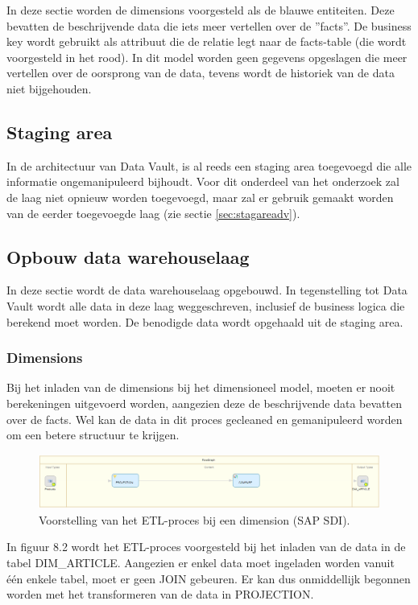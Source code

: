 In deze sectie worden de dimensions voorgesteld als de blauwe entiteiten. Deze bevatten de beschrijvende data die iets meer vertellen over de ''facts''. De business key wordt gebruikt als attribuut die de relatie legt naar de facts-table (die wordt voorgesteld in het rood). In dit model worden geen gegevens opgeslagen die meer vertellen over de oorsprong van de data, tevens wordt de historiek van de data niet bijgehouden.

\subsection{Staging area}
In de architectuur van Data Vault, is al reeds een staging area toegevoegd die alle informatie ongemanipuleerd bijhoudt. Voor dit onderdeel van het onderzoek zal de laag niet opnieuw worden toegevoegd, maar zal er gebruik gemaakt worden van de eerder toegevoegde laag (zie sectie \ref{sec:stagareadv}).

\subsection{Opbouw data warehouselaag}
In deze sectie wordt de data warehouselaag opgebouwd. In tegenstelling tot Data Vault wordt alle data in deze laag weggeschreven, inclusief de business logica die berekend moet worden. De benodigde data wordt opgehaald uit de staging area.

\subsubsection{Dimensions}
Bij het inladen van de dimensions bij het dimensioneel model, moeten er nooit berekeningen uitgevoerd worden, aangezien deze de beschrijvende data bevatten over de facts. Wel kan de data in dit proces gecleaned en gemanipuleerd worden om een betere structuur te krijgen. 

\begin{figure}[h]
	\centering
	\includegraphics[scale=0.5]{../images/DM_FG_dim.png}
	\caption{Voorstelling van het ETL-proces bij een dimension (SAP SDI).}
	\label{fig:DM_FG_dim}
\end{figure}

In figuur 8.2 wordt het ETL-proces voorgesteld bij het inladen van de data in de tabel DIM\_ARTICLE. Aangezien er enkel data moet ingeladen worden vanuit één enkele tabel, moet er geen JOIN gebeuren. Er kan dus onmiddellijk begonnen worden met het transformeren van de data in PROJECTION. 

